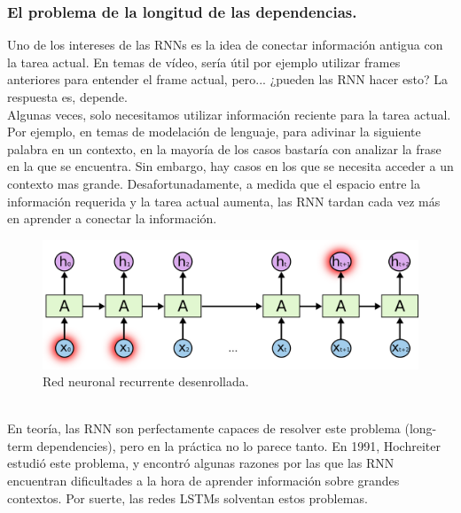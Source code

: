 \subsubsection{El problema de la longitud de las dependencias.}
Uno de los intereses de las RNNs es la idea de conectar información antigua con la tarea actual. En temas de vídeo, sería útil por ejemplo utilizar frames anteriores para entender el frame actual, pero... ¿pueden las RNN hacer esto? La respuesta es, depende.\\
Algunas veces, solo necesitamos utilizar información reciente para la tarea actual. Por ejemplo, en temas de modelación de lenguaje, para adivinar la siguiente palabra en un contexto, en la mayoría de los casos bastaría con analizar la frase en la que se encuentra. Sin embargo, hay casos en los que se necesita acceder a un contexto mas grande. Desafortunadamente, a medida que el espacio entre la información requerida y la tarea actual aumenta, las RNN tardan cada vez más en aprender a conectar la información.\\
\begin{figure}[htp]
\centering
\includegraphics[scale=0.3]{images/RNN-longtermdependencies.png}
\caption{Red neuronal recurrente desenrollada.}
\end{figure}
\\En teoría, las RNN son perfectamente capaces de resolver este problema (long-term dependencies), pero en la práctica no lo parece tanto. En 1991, Hochreiter estudió este problema, y encontró algunas razones por las que las RNN encuentran dificultades a la hora de aprender información sobre grandes contextos. Por suerte, las redes LSTMs solventan estos problemas.
